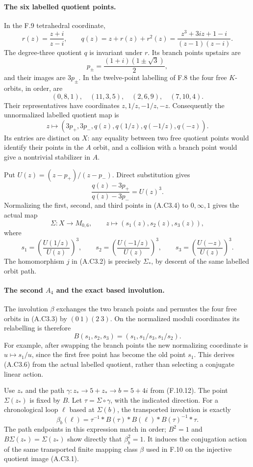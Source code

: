 \paragraph{The six labelled quotient points.}
In the F.9 tetrahedral coordinate,
\[
 r(z)=\frac{z+i}{z-i},\qquad
 q(z)=z+r(z)+r^2(z)
     =\frac{z^3+3iz+1-i}{(z-1)(z-i)}.
\]
The degree-three quotient $q$ is invariant under $r$.
Its branch points upstairs are
\[
 p_\pm=\frac{(1+i)(1\pm\sqrt3)}2,
\]
and their images are $3p_\pm$.  In the twelve-point
labelling of F.8 the four free $K$-orbits, in order, are
\[
 (0,8,1),\quad(11,3,5),\quad(2,6,9),\quad(7,10,4).
                                                               \tag{A.C3.3}
\]
Their representatives have coordinates $z,1/z,-1/z,-z$.
Consequently the unnormalized labelled quotient map is
\[
 z\longmapsto
   (3p_+,3p_-,q(z),q(1/z),q(-1/z),q(-z)).                \tag{A.C3.4}
\]
Its entries are distinct on $X$: any equality between two
free quotient points would identify their points in the
$A$ orbit, and a collision with a branch point would give a
nontrivial stabilizer in $A$.

Put $U(z)=(z-p_+)/(z-p_-)$.
Direct substitution gives
\[
       \frac{q(z)-3p_+}{q(z)-3p_-}=U(z)^3.
\]
Normalizing the first, second, and third points in (A.C3.4)
to $0,\infty,1$ gives the actual map
\[
 \Sigma:X\longrightarrow M_{0,6},\qquad
 z\longmapsto(s_1(z),s_2(z),s_3(z)),
\]
where
\[
 s_1=\left(\frac{U(1/z)}{U(z)}\right)^3,
 \qquad
 s_2=\left(\frac{U(-1/z)}{U(z)}\right)^3,
 \qquad
 s_3=\left(\frac{U(-z)}{U(z)}\right)^3.                 \tag{A.C3.5}
\]
The homomorphism $j$ in (A.C3.2) is precisely $\Sigma_*$,
by descent of the same labelled orbit path.

\paragraph{The second $A_4$ and the exact based involution.}
The involution $\beta$ exchanges the two branch points and
permutes the four free orbits in (A.C3.3) by $(0\ 1)(2\ 3)$.
On the normalized moduli coordinates its relabelling is
therefore
\[
 B(s_1,s_2,s_3)=(s_1,s_1/s_3,s_1/s_2).                 \tag{A.C3.6}
\]
For example, after swapping the branch points the new
normalizing coordinate is $u\mapsto s_1/u$, since the
first free point has become the old point $s_1$.
This derives (A.C3.6) from the actual labelled quotient,
rather than selecting a conjugate linear action.

Use $z_*$ and the path
$\gamma:z_*\to5+z_*\to b=5+4i$ from (F.10.12).
The point $\Sigma(z_*)$ is fixed by $B$.  Let
$\tau=\Sigma\circ\gamma$, with the indicated direction.
For a chronological loop $\ell$ based at $\Sigma(b)$, the
transported involution is exactly
\[
 \beta_b(\ell)=
 \tau^{-1}*B(\tau)*B(\ell)*B(\tau)^{-1}*\tau.          \tag{A.C3.7}
\]
The path endpoints in this expression match in order;
$B^2=1$ and $B\Sigma(z_*)=\Sigma(z_*)$ show directly that
$\beta_b^2=1$.  It induces the conjugation action of the
same transported finite mapping class $\beta$ used in F.10
on the injective quotient image (A.C3.1).

